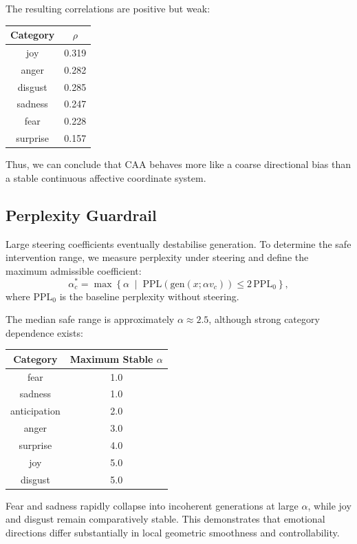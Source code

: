 \documentclass[12pt,twoside]{report}
\begin{document}
The resulting correlations are positive but weak:
\begin{center}
\begin{tabular}{c|c}
Category & $\rho$ \\
\hline
joy & 0.319 \\
anger & 0.282 \\
disgust & 0.285 \\
sadness & 0.247 \\
fear & 0.228 \\
surprise & 0.157
\end{tabular}
\end{center}

Thus, we can conclude that CAA behaves more like a coarse directional bias than a stable continuous affective coordinate system.

\subsection{Perplexity Guardrail}
\label{sec:emotion_code:caa:ppl}

Large steering coefficients eventually destabilise generation.
To determine the safe intervention range, we measure perplexity under steering and
define the maximum admissible coefficient:
\begin{equation}
\alpha_c^*
=
\max
\left\{
\alpha
\;\middle|\;
\mathrm{PPL}(\mathrm{gen}(x;\alpha v_c))
\le
2\,\mathrm{PPL}_0
\right\},
\end{equation}
where $\mathrm{PPL}_0$ is the baseline perplexity without steering.

The median safe range is approximately $\alpha\approx 2.5$, although strong
category dependence exists:
\begin{center}
\begin{tabular}{c|c}
Category & Maximum Stable $\alpha$ \\
\hline
fear & 1.0 \\
sadness & 1.0 \\
anticipation & 2.0 \\
anger & 3.0 \\
surprise & 4.0 \\
joy & 5.0 \\
disgust & 5.0
\end{tabular}
\end{center}

Fear and sadness rapidly collapse into incoherent generations at large $\alpha$,
while joy and disgust remain comparatively stable. This demonstrates that emotional
directions differ substantially in local geometric smoothness and controllability.
\end{document}
